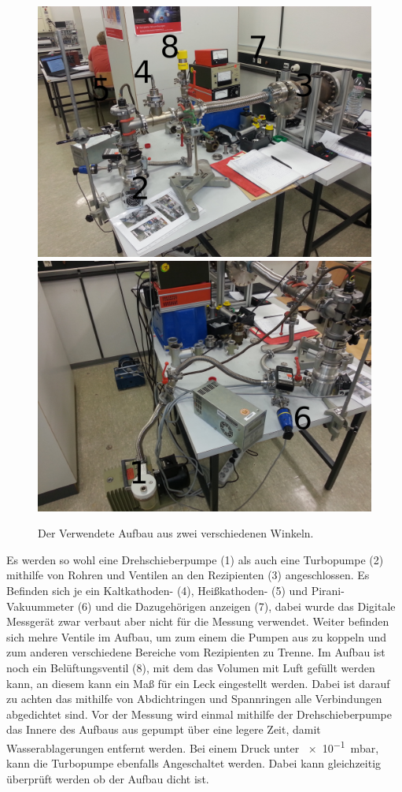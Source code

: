 \begin{figure}[h!]
\centering
\includegraphics[scale=0.06]{../Grafiken/Aufbau_.jpg}
\includegraphics[scale=0.06]{../Grafiken/Drehschieber_.jpg}
\caption{Der Verwendete Aufbau aus zwei verschiedenen Winkeln.\label{fig:Aufbau}}
\end{figure}
Es werden so wohl eine Drehschieberpumpe (1) als auch eine Turbopumpe (2) mithilfe von Rohren und Ventilen an den Rezipienten (3) angeschlossen.
Es Befinden sich je ein Kaltkathoden- (4), Heißkathoden- (5) und Pirani-Vakuummeter (6) und die Dazugehörigen anzeigen (7), dabei wurde das Digitale Messgerät zwar verbaut aber nicht für die Messung verwendet.
Weiter befinden sich mehre Ventile im Aufbau, um zum einem die Pumpen aus zu koppeln und zum anderen verschiedene Bereiche vom Rezipienten zu Trenne. Im Aufbau ist noch ein Belüftungsventil (8), mit dem das Volumen mit Luft gefüllt werden kann, an diesem kann ein Maß für ein Leck eingestellt werden.
Dabei ist darauf zu achten das mithilfe von Abdichtringen und Spannringen alle Verbindungen abgedichtet sind.
Vor der Messung wird einmal mithilfe der Drehschieberpumpe  das Innere des Aufbaus aus gepumpt über eine legere Zeit, damit Wasserablagerungen entfernt werden. Bei einem Druck unter \SI{e-1}{\milli\bar}, kann die Turbopumpe ebenfalls Angeschaltet werden. Dabei kann gleichzeitig überprüft werden ob der Aufbau dicht ist.
